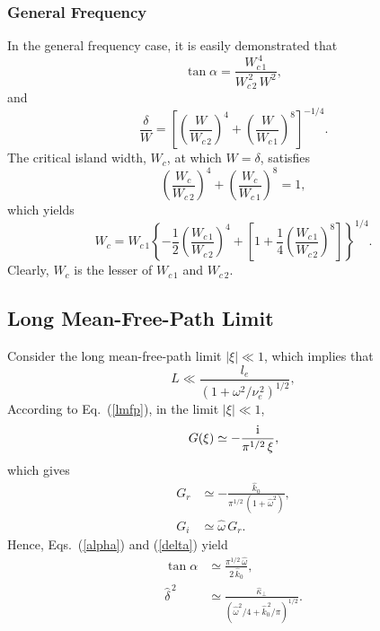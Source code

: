 \documentclass[12pt,prb,aps]{revtex4-1}
\begin{document}
\subsubsection{General Frequency}
In the general frequency case, it is easily demonstrated that
\begin{equation}
\tan\alpha  = \frac{W_{c\,1}^{\,4}}{W_{c\,2}^{\,2}\,W^2},
\end{equation}
and
\begin{equation}
\frac{\delta}{W} = \left[\left(\frac{W}{W_{c\,2}}\right)^4 + \left(\frac{W}{W_{c\,1}}\right)^8\right]^{-1/4}.
\end{equation}
The critical island width, $W_c$,  at which $W=\delta$, satisfies
\begin{equation}
\left(\frac{W_c}{W_{c\,2}}\right)^4 + \left(\frac{W_c}{W_{c\,1}}\right)^8= 1,
\end{equation}
which yields 
\begin{equation}
W_c= W_{c\,1}\left\{-\frac{1}{2}
\left(\frac{W_{c\,1}}{W_{c\,2}}\right)^4
+\left[1+\frac{1}{4}\left(\frac{W_{c\,1}}{W_{c\,2}}\right)^8\right]
\right\}^{1/4}.
\end{equation}
Clearly, $W_c$ is the lesser of $W_{c\,1}$ and $W_{c\,2}$. 

\subsection{Long Mean-Free-Path Limit}
Consider the long mean-free-path limit 
 $|\xi|\ll 1$, which implies that
\begin{equation}
L\ll \frac{l_e}{(1+\omega^2/\nu_e^{\,2})^{1/2}},
\end{equation}
According to Eq.~(\ref{lmfp}), in the limit $|\xi|\ll 1$, 
\begin{equation}
G(\xi) \simeq -\frac{{\rm i}}{\pi^{1/2}\,\xi},
\end{equation}
which gives
\begin{align}
G_r&\simeq -\frac{\hat{k}_0}{\pi^{1/2}\,(1+\hat{\omega}^2)},\\[0.5ex]
G_i &\simeq \hat{\omega}\,G_r.
\end{align}
Hence, Eqs.~(\ref{alpha}) and (\ref{delta}) yield
\begin{align}\label{e135}
\tan\alpha&\simeq \frac{\pi^{1/2}\,\hat{\omega}}{2\,\hat{k}_0},\\[0.5ex]
\hat{\delta}^{\,2}&\simeq \frac{\hat{\kappa}_\perp}{(\hat{\omega}^2/4 + \hat{k}_0^{\,2}/\pi)^{1/2}}.\label{e136}
\end{align}
\end{document}
